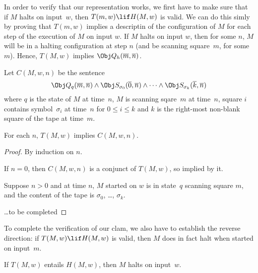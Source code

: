 \documentclass[../../include/open-logic-section]{subfiles}
\begin{document}

\begin{explain}
In order to verify that our representation works, we first have to
make sure that if $M$ halts on input~$w$, then $T(m, w) \lif H(M, w)$
is valid.  We can do this simly by proving that $T(m, w)$ implies a
descriptin of the configuration of $M$ for each step of the execution
of $M$ on input $w$.  If $M$ halts on input $w$, then for some $n$,
$M$ will be in a halting configuration at step $n$ (and be scanning
square~$m$, for some $m$).  Hence, $T(M, w)$ implies $\Obj
Q_h(\overline m, \overline n)$.  
\end{explain}

\begin{defn}
Let $C(M, w, n)$ be the sentence
\[
\Obj Q_q(\overline m, \overline n) \land \Obj S_{\sigma_0}(\overline
0, \overline n) \land \dots \land \Obj S_{\sigma_k}(\overline k,
\overline n)
\]
where $q$ is the state of $M$ at time~$n$, $M$ is scanning sqare~$m$
at time~$n$, square $i$ contains symbol~$\sigma_i$ at time~$n$ for $0
\le i \le k$ and $k$ is the right-most non-blank square of the tape at
time~$m$.
\end{defn}

\begin{lem}
For each $n$, $T(M, w)$ implies $C(M, w, n)$.
\end{lem}

\begin{proof}
By induction on $n$.

If $n = 0$, then $C(M, w, n)$ is a conjunct of $T(M, w)$, so implied by it.

Suppose $n > 0$ and at time $n$, $M$ started on $w$ is in state~$q$
scanning square $m$, and the content of the tape is $\sigma_0$, \dots,
$\sigma_k$.

\dots to be completed

\end{proof}

\begin{explain}
To complete the verification of our clam, we also have to establish
the reverse direction: if $T(M, w) \lif H(M, w)$ is valid, then $M$
does in fact halt when started on input~$m$.  
\end{explain}

\begin{lem}
If $T(M, w)$ entails $H(M, w)$, then $M$ halts on input~$w$.
\end{lem}
\end{document}
